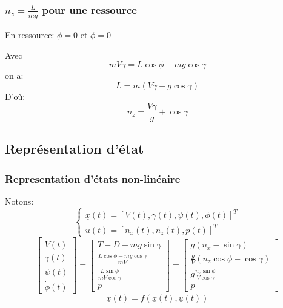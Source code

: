 \documentclass[footheight=2em]{beamer}
\begin{document}

\begin{frame}
    \frametitle{\(n_z = \frac{L}{mg}\) pour une ressource}\pause{}
    En ressource: \(\phi = 0\) et \(\dot{\phi} = 0\)\pause{}

    Avec \[ mV\dot{\gamma} = L\cos \phi - mg \cos \gamma \]
    on a:\[ L = m(V\dot{\gamma} + g \cos \gamma)\] \pause{}
    D'où:\[ \boxed{n_z = \frac{V\dot{\gamma}}{g} + \cos \gamma}\]
\end{frame}

\subsection{Représentation d'état}

\begin{frame}
    \frametitle{Representation d'états non-linéaire}\pause{}
    Notons:
    \[
    \left \{
    \begin{array}{l}
        \underline{x}(t) = {[V(t), \gamma (t), \psi (t), \phi (t)]}^{T}\\
        \underline{u}(t) = {[n_x(t), n_z(t), p(t)]}^{T}
    \end{array}
    \right.
    \]\pause{}
    \[
    \left[
    \begin{array}{c}
        \dot{V}(t)\\
        \dot{\gamma}(t)\\
        \dot{\psi}(t)\\
        \dot{\phi}(t)
    \end{array}
    \right]
    =
    \left[
    \begin{array}{c}
        T - D - mg \sin \gamma \\
        \frac{L\cos \phi - mg\cos \gamma}{mV} \\
        \frac{L\sin \phi}{mV\cos \gamma} \\
        p
    \end{array}
    \right]
    =
    \left[
    \begin{array}{c}
        g(n_x - \sin \gamma) \\
        \frac{g}{V}(n_z \cos \phi - \cos \gamma)\\
        g \frac{n_z \sin \phi}{V \cos \gamma} \\
        p
    \end{array}
    \right]
    \]\pause{}
    \[
    \underline{\dot{x}}(t)=f(\underline{x}(t),\underline{u}(t))
    \]
\end{frame}
\end{document}
